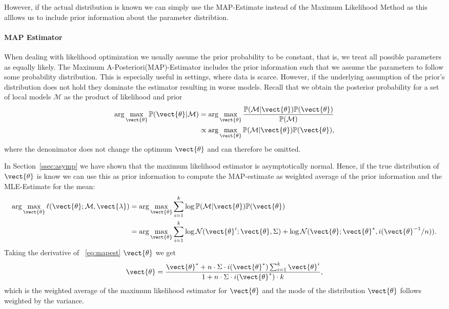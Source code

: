 However, if the actual distribution is known we can simply use the MAP-Estimate instead of the Maximum Likelihood Method as this alllows us to include prior information about the parameter distribtion.

\paragraph*{MAP Estimator}
When dealing with likelihood optimization we usually assume the prior probability to be constant, that is, we treat all possible parameters as equally likely.
The Maximum A-Posteriori(MAP)-Estimator includes the prior information such that we assume the parameters to follow some probability distribution.
This is especially useful in settings, where data is scarce.
However, if the underlying assumption of the prior's distribution does not hold they dominate the estimator resulting in worse models.
Recall that we obtain the posterior probability for a set of local models $\mathcal{M}$ as the product of likelihood and prior
\begin{equation}
    \begin{split}
    \arg\max_{\vect{\theta}}\mathbb{P}(\vect{\theta} \lvert \mathcal{M} ) &= \arg\max_{\vect{\theta}} \frac{\mathbb{P}(\mathcal{M}\lvert \vect{\theta}) \mathbb{P}(\vect{\theta}) }{\mathbb{P}(\mathcal{M})} \\
    &\propto  \arg\max_{\vect{\theta}}\mathbb{P}(\mathcal{M}\lvert \vect{\theta}) \mathbb{P}(\vect{\theta})  ,
    \end{split}
\end{equation}
where the denonimator does not change the optimum \wrt $\vect{\theta}$ and can therefore be omitted.

In Section~\ref{ssec:asymp} we have shown that the maximum likelihood estimator is asymptotically normal.
Hence, if the true distribution of $\vect{\theta}$ is know we can use this as prior information to compute the MAP-estimate as weighted average of the prior information and the MLE-Estimate for the mean:
\begin{equation}
    \label{eq:mapest}
    \begin{split}
    \arg\max_{\vect{\theta}} \ell(\vect{\theta}; \mathcal{M}, \vect{\lambda}) &= \arg\max_{\vect{\theta}} \sum_{i=1}^k \log \mathbb{P}(\mathcal{M}\lvert \vect{\theta}) \mathbb{P}(\vect{\theta}) \\
    &= \arg\max_{\vect{\theta}} \sum_{i=1}^k \log \mathcal{N}(\vect{\theta}^i ; \vect{\theta}, \Sigma) + \log \mathcal{N}(\vect{\theta}; \vect{\theta}^*, i(\vect{\theta}^{-1}/n)).
    \end{split}
\end{equation}
Taking the derivative of \eq~\ref{eq:mapest} \wrt $\vect{\theta}$ we get
\begin{equation}
    \vect{\theta} = \frac{\vect{\theta}^*  + n \cdot \Sigma \cdot i(\vect{\theta}^*) \sum_{i=1}^k \vect{\theta}^i}{1 + n \cdot \Sigma \cdot i(\vect{\theta}^*) \cdot k},
\end{equation}
which is the weighted average of the maximum likelihood estimator for $\vect{\theta}$ and the mode of the distribution $\vect{\theta}$ follows weighted by the variance.

